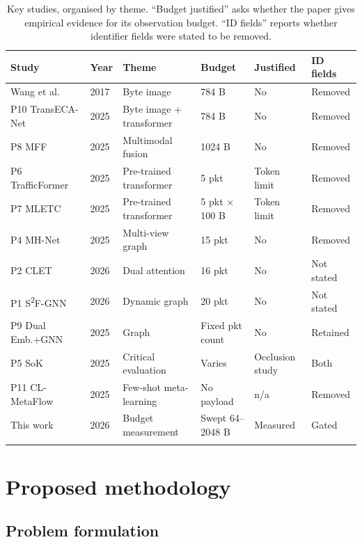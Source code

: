 \documentclass[pdflatex,sn-mathphys-num]{sn-jnl}
\theoremstyle{thmstyleone}%
\theoremstyle{thmstylethree}%
\begin{document}
\begin{table}[tbp]
\caption{Key studies, organised by theme. ``Budget justified'' asks whether the
paper gives empirical evidence for its observation budget. ``ID fields''
reports whether identifier fields were stated to be removed.}\label{tab:related}
\small
\begin{tabular}{@{}p{24mm}l p{25mm} p{20mm} p{16mm} p{14mm}@{}}
\toprule
Study & Year & Theme & Budget & Justified & ID fields \\
\midrule
Wang et al.~\cite{ustc} & 2017 & Byte image & 784 B & No & Removed \\
P10 TransECA-Net~\cite{p10} & 2025 & Byte image + transformer & 784 B & No & Removed \\
P8 MFF~\cite{p8} & 2025 & Multimodal fusion & 1024 B & No & Removed \\
P6 TrafficFormer~\cite{p6} & 2025 & Pre-trained transformer & 5 pkt & Token limit & Removed \\
P7 MLETC~\cite{p7} & 2025 & Pre-trained transformer & 5 pkt $\times$ 100 B & Token limit & Removed \\
P4 MH-Net~\cite{p4} & 2025 & Multi-view graph & 15 pkt & No & Removed \\
P2 CLET~\cite{p2} & 2026 & Dual attention & 16 pkt & No & Not stated \\
P1 S\textsuperscript{2}F-GNN~\cite{p1} & 2026 & Dynamic graph & 20 pkt & No & Not stated \\
P9 Dual Emb.+GNN~\cite{p9} & 2025 & Graph & Fixed pkt count & No & Retained \\
P5 SoK~\cite{p5} & 2025 & Critical evaluation & Varies & Occlusion study & Both \\
P11 CL-MetaFlow~\cite{p11} & 2025 & Few-shot meta-learning & No payload & n/a & Removed \\
This work & 2026 & Budget measurement & Swept 64--2048 B & Measured & Gated \\
\botrule
\end{tabular}
\end{table}

\section{Proposed methodology}\label{sec:method}

\subsection{Problem formulation}
\end{document}
